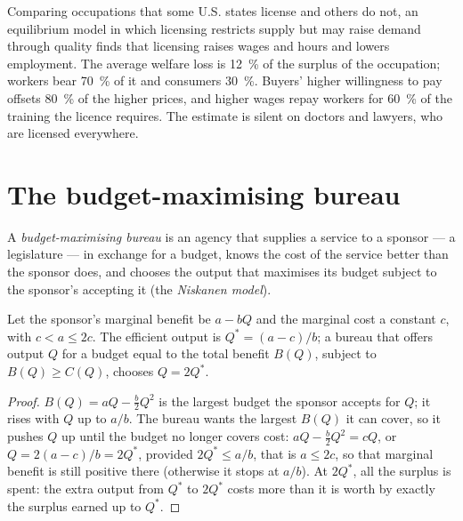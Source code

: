 \begin{measure}
Comparing occupations that some U.S. states license and others do not, an
equilibrium model in which licensing restricts supply but may raise demand through
quality finds that licensing raises wages and hours and lowers employment. The
average welfare loss is 12~\% of the surplus of the occupation; workers bear 70~\% of it
and consumers 30~\%. Buyers' higher willingness to pay offsets 80~\% of the higher
prices, and higher wages repay workers for 60~\% of the training the licence
requires. %
The estimate is silent on doctors and lawyers, who are licensed everywhere.
\end{measure}

\section{The budget-maximising bureau}\label{sec:b3:interest-groups-and-regulation:bureau}

\begin{definition}\label{def:b3:interest-groups-and-regulation:bureau}
A \emph{budget-maximising bureau} is an agency that supplies a service to a sponsor
--- a legislature --- in exchange for a budget, knows the cost of the service better
than the sponsor does, and chooses the output that maximises its budget subject to
the sponsor's accepting it (the \emph{Niskanen model}).
\end{definition}

\begin{proposition}\label{prop:b3:interest-groups-and-regulation:niskanen}
Let the sponsor's marginal benefit be $a - bQ$ and the marginal cost a constant $c$, with $c < a \le 2c$. The
efficient output is $Q^* = (a - c)/b$; a bureau that offers output $Q$ for a budget equal to the
total benefit $B(Q)$, subject to $B(Q) \ge C(Q)$, chooses $Q = 2Q^*$.
\end{proposition}

\begin{proof}
$B(Q) = aQ - \tfrac b2Q^2$ is the largest budget the sponsor accepts for $Q$; it rises with $Q$ up to
$a/b$. The bureau wants the largest $B(Q)$ it can cover, so it pushes $Q$ up until the
budget no longer covers cost: $aQ - \tfrac b2Q^2 = cQ$, or $Q = 2(a - c)/b = 2Q^*$, provided $2Q^* \le a/b$, that is
$a \le 2c$, so that marginal benefit is still positive there (otherwise it stops at $a/b$). At $2Q^*$, all the surplus is spent: the extra output
from $Q^*$ to $2Q^*$ costs more than it is worth by exactly the surplus earned up to $Q^*$.
\end{proof}

